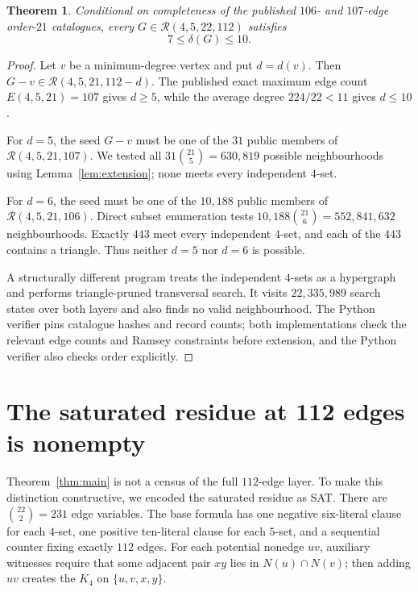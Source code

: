 \documentclass[10pt]{article}
\newtheorem{theorem}{Theorem}
\theoremstyle{definition}
\theoremstyle{remark}
\newcommand{\Rcal}{\mathcal{R}}
\begin{document}
\begin{theorem}\label{thm:mindegree}
Conditional on completeness of the published $106$- and $107$-edge
order-$21$ catalogues, every $G\in\Rcal(4,5,22,112)$ satisfies
\[
 7\leq\delta(G)\leq10.
\]
\end{theorem}

\begin{proof}
Let $v$ be a minimum-degree vertex and put $d=d(v)$.  Then
$G-v\in\Rcal(4,5,21,112-d)$.  The published exact maximum edge count
$E(4,5,21)=107$ \cite{angeltveit-mckay-2026,catalogue} gives $d\geq5$,
while the average degree $224/22<11$ gives $d\leq10$.

For $d=5$, the seed $G-v$ must be one of the $31$ public members of
$\Rcal(4,5,21,107)$.  We tested all
$31\binom{21}{5}=630{,}819$ possible neighbourhoods using
Lemma~\ref{lem:extension}; none meets every independent $4$-set.

For $d=6$, the seed must be one of the $10{,}188$ public members of
$\Rcal(4,5,21,106)$.  Direct subset enumeration tests
$10{,}188\binom{21}{6}=552{,}841{,}632$ neighbourhoods.  Exactly $443$
meet every independent $4$-set, and each of the $443$ contains a triangle.
Thus neither $d=5$ nor $d=6$ is possible.

A structurally different program treats the independent
$4$-sets as a hypergraph and performs triangle-pruned transversal search.
It visits $22{,}335{,}989$ search states over both layers and also finds no
valid neighbourhood.  The Python verifier pins catalogue hashes and record
counts; both implementations check the relevant edge counts and Ramsey
constraints before extension, and the Python verifier also checks order
explicitly.
\end{proof}

\section{The saturated residue at 112 edges is nonempty}

Theorem~\ref{thm:main} is not a census of the full $112$-edge layer.
To make this distinction constructive, we encoded the saturated residue as
SAT.  There are $\binom{22}{2}=231$ edge variables.  The base formula has
one negative six-literal clause for each $4$-set, one positive ten-literal
clause for each $5$-set, and a sequential counter \cite{sinz-2005} fixing
exactly $112$ edges.  For each potential nonedge $uv$, auxiliary witnesses require that
some adjacent pair $xy$ lies in $N(u)\cap N(v)$; then adding $uv$ creates the
$K_4$ on $\{u,v,x,y\}$.
\end{document}
